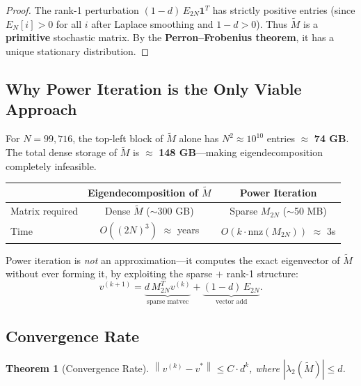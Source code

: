 \documentclass[12pt,a4paper]{article}
\theoremstyle{definition}
\theoremstyle{plain}
\newtheorem{theorem}{Theorem}[section]
\newcommand{\norm}[1]{\left\|#1\right\|}
\begin{document}
\begin{proof}
  The rank-1 perturbation $(1-d)\,E_{2N}\bm{1}^T$ has strictly positive entries (since
  $E_N[i]>0$ for all $i$ after Laplace smoothing and $1-d>0$). Thus $\widetilde{M}$ is
  a \textbf{primitive} stochastic matrix. By the \textbf{Perron--Frobenius theorem}, it
  has a unique stationary distribution. \qedhere
\end{proof}

\subsection{Why Power Iteration is the Only Viable Approach}

\begin{memorybox}
  For $N = 99{,}716$, the top-left block of $\widetilde{M}$ alone has $N^2 \approx
  10^{10}$ entries $\approx$ \textbf{74 GB}. The total dense storage of $\widetilde{M}$
  is $\approx$ \textbf{148 GB}---making eigendecomposition completely infeasible.
\end{memorybox}

\begin{center}
\renewcommand{\arraystretch}{1.3}
\begin{tabular}{lcc}
\hline
& \textbf{Eigendecomposition of $\widetilde{M}$} & \textbf{Power Iteration}\\
\hline
Matrix required & Dense $\widetilde{M}$ ($\sim$300 GB) & Sparse $M_{2N}$ ($\sim$50 MB)\\
Time & $O((2N)^3)$ $\approx$ years & $O(k \cdot \text{nnz}(M_{2N}))$ $\approx$ 3s\\
\hline
\end{tabular}
\end{center}

\begin{insight}
  Power iteration is \emph{not} an approximation---it computes the exact eigenvector of
  $\widetilde{M}$ without ever forming it, by exploiting the sparse $+$ rank-1 structure:
  \[
    v^{(k+1)} =
    \underbrace{d\,M_{2N}^T v^{(k)}}_{\text{sparse matvec}}
    + \underbrace{(1-d)\,E_{2N}}_{\text{vector add}}.
  \]
\end{insight}

\subsection{Convergence Rate}

\begin{theorem}[Convergence Rate]
  \label{thm:conv}
  $\norm{v^{(k)} - v^*} \leq C\cdot d^k$, where $|\lambda_2(\widetilde{M})| \leq d$.
\end{theorem}
\end{document}
